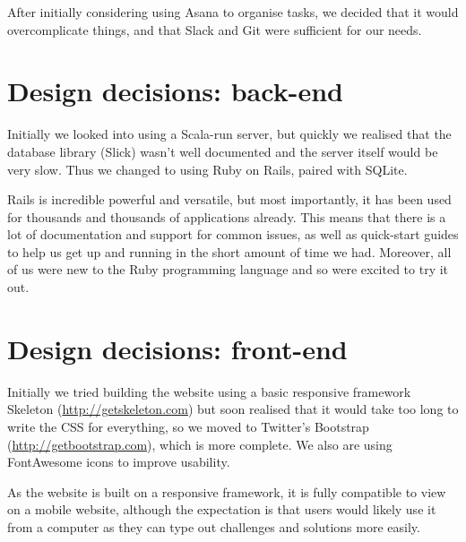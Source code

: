 \documentclass{report}
\begin{document}
After initially considering using Asana to organise tasks, we decided that it would overcomplicate things, and that Slack and Git were sufficient for our needs.

\section{Design decisions: back-end}
Initially we looked into using a Scala-run server, but quickly we realised that the database library (Slick) wasn’t well documented and the server itself would be very slow. Thus we changed to using Ruby on Rails, paired with SQLite.

Rails is incredible powerful and versatile, but most importantly, it has been used for thousands and thousands of applications already. This means that there is a lot of documentation and support for common issues, as well as quick-start guides to help us get up and running in the short amount of time we had. Moreover, all of us were new to the Ruby programming language and so were excited to try it out.

\section{Design decisions: front-end}
Initially we tried building the website using a basic responsive framework Skeleton (\url{http://getskeleton.com}) but soon realised that it would take too long to write the CSS for everything, so we moved to Twitter’s Bootstrap (\url{http://getbootstrap.com}), which is more complete. We also are using FontAwesome icons to improve usability.

As the website is built on a responsive framework, it is fully compatible to view on a mobile website, although the expectation is that users would likely use it from a computer as they can type out challenges and solutions more easily.
\end{document}
